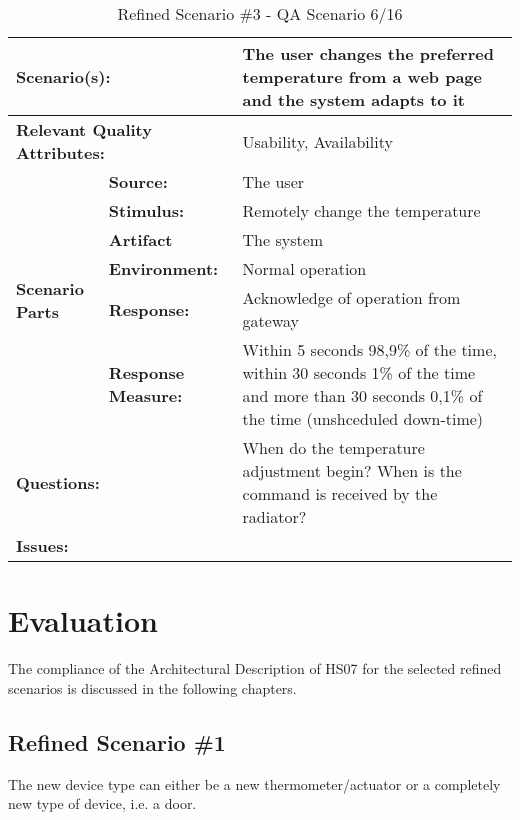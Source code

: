 \documentclass[a4paper,10pt]{article}
\begin{document}
\begin{table}[!htp]
\begin{center}
\begin{tabular}{|p{0.3cm}|p{2.5cm}|p{8cm}|}
  \hline
  \multicolumn{2}{|p{3cm}|}{\bfseries Scenario(s):} & The user changes the preferred temperature from a web page and the system adapts to it \\
  \hline
  \multicolumn{2}{|p{3cm}|}{\bfseries Relevant Quality Attributes:} & Usability,  Availability \\
  \hline
  \multirow{6}{*}{\begin{sideways}{\bfseries Scenario Parts}\end{sideways}}
  & {\bfseries Source:} & The user \\
  \cline{2-3}
  & {\bfseries Stimulus:} & Remotely change the temperature \\
  \cline{2-3}
  & {\bfseries Artifact} & The system \\
  \cline{2-3}
  & {\bfseries Environment:} & Normal operation \\
  \cline{2-3}
  & {\bfseries Response:} & Acknowledge of operation from gateway \\
  \cline{2-3}
  & {\bfseries Response \mbox{Measure:}} & Within 5 seconds 98,9\% of the time, within 30 seconds 1\% of the time and more than 30 seconds 0,1\% of the time (unshceduled down-time) \\
  \hline
  \multicolumn{2}{|p{3cm}|}{\bfseries Questions:} & When do the temperature adjustment begin? When is the command is received by the radiator? \\
  \hline
  \multicolumn{2}{|p{3cm}|}{\bfseries Issues:} &  \\
  \hline
\end{tabular}
\caption{Refined Scenario \#3 - QA Scenario 6/16}
\label{scenario3}
\end{center}
\end{table}


\section{Evaluation}
The compliance of the Architectural Description of HS07 \cite{SAiP1H1} for the selected refined scenarios
is discussed in the following chapters.
\subsection{Refined Scenario \#1}
The new device type can either be a new thermometer/actuator or a completely new type of device, i.e. a door. 
\end{document}
